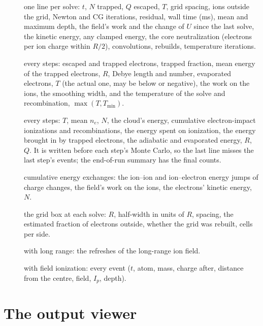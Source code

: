 \begin{description}
  \item[] one line per solve: $t$, $N$ trapped, $Q$ escaped, $T$, grid spacing, ions outside the
    grid, Newton and CG iterations, residual, wall time (ms), mean and maximum depth, the field's work and the change of
    $U$ since the last solve, the kinetic energy, any clamped energy, the core neutralization (electrons per ion charge
    within $R/2$), convolutions, rebuilds, temperature iterations.
  \item[] every  steps: escaped and trapped electrons, trapped fraction, mean
    energy of the trapped electrons, $R$, Debye length and number, evaporated electrons, $T$ (the actual one, may be
    below  or negative), the work on the ions, the smoothing width, and the temperature of the solve
    and recombination, $\max(T, T_{\min})$.
  \item[] every  steps: $T$, mean $n_e$, $N$, the cloud's energy, cumulative
    electron-impact ionizations and recombinations, the energy spent on ionization, the energy brought in by trapped
    electrons, the adiabatic and evaporated energy, $R$, $Q$.
    It is written before each step's Monte Carlo, so the last line misses the last step's events; the end-of-run
    summary has the final counts.
  \item[] cumulative energy exchanges: the ion--ion and ion--electron energy jumps of charge
    changes, the field's work on the ions, the electrons' kinetic energy, $N$.
  \item[] the grid box at each solve: $R$, half-width in units of $R$, spacing, the estimated fraction
    of electrons outside, whether the grid was rebuilt, cells per side.
  \item[] with long range: the refreshes of the long-range ion field.
  \item[] with field ionization: every event ($t$, atom, mass, charge after, distance from
    the centre, field, $I_p$, depth).
\end{description}

\section{The output viewer}
\label{sec:viewer}


